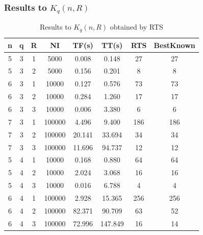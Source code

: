 \documentclass{beamer}
\begin{document}
\begin{frame}
  \frametitle{Results to $K_{q}(n,R)$}
{
\scriptsize
\begin{table}[h]
\label{codeResult}
\begin{center}
\begin{tabular}{|c|c|c|c|c|c|c|c|}
\hline n & q & R & NI & TF(s) & TT(s) & RTS & BestKnown \\ \hline
5 & 3 & 1 & 5000 & 0.008 & 0.148 & 27 & 27 \\ \hline 5 & 3 & 2 &
5000 & 0.156 & 0.201 & 8 & 8 \\ \hline 6 & 3 & 1 & 10000 & 0.127 &
0.576
& 73 & 73 \\ \hline 6 & 3 & 2 & 10000 & 0.284 & 1.260 & 17 & 17 \\
\hline 6 & 3 & 3 & 10000 & 0.006 & 3.380 & 6 & 6 \\ \hline 7 & 3 &
1 & 100000 & 4.496 & 9.400 & 186 & 186 \\ \hline 7 & 3 & 2 &
100000 & 20.141 & 33.694 & 34 & 34 \\ \hline 7 & 3 & 3 & 100000 &
11.696 & 94.737 & 12 & 12 \\ \hline 5 & 4 & 1 & 10000 & 0.168 &
0.880 & 64 & 64 \\ \hline 5 & 4 & 2 & 10000 & 2.024 & 3.068 & 16 &
16 \\ \hline 5 & 4 & 3 & 10000 & 0.016 & 6.788 & 4 & 4 \\ \hline 6
& 4 & 1 & 100000 & 2.928 & 15.365 & 256 & 256 \\ \hline 6 & 4 & 2
& 100000 & 82.371 & 90.709 & 63 & 52 \\ \hline 6 & 4 & 3 & 100000
& 72.996 & 147.849 & 16 & 14 \\ \hline
\end{tabular}
\end{center}
\caption{Results to $K_{q}(n,R)$ obtained by RTS}
\end{table}
}
\end{frame}
\end{document}
